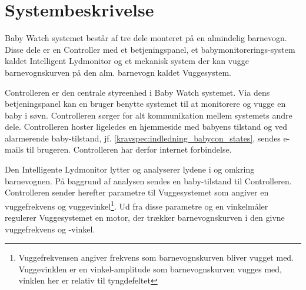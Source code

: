 \chapter{Systembeskrivelse}
Baby Watch systemet består af tre dele monteret på en almindelig barnevogn. Disse dele er en Controller med et betjeningspanel, et babymonitorerings-system kaldet Intelligent Lydmonitor og et mekanisk system der kan vugge barnevognskurven på den alm. barnevogn kaldet Vuggesystem.

Controlleren er den centrale styreenhed i Baby Watch systemet. Via dens betjeningspanel kan en bruger benytte systemet til at monitorere og vugge en baby i søvn. Controlleren sørger for alt kommunikation mellem systemets andre dele. Controlleren hoster ligeledes en hjemmeside med babyens tilstand og ved alarmerende baby-tilstand, jf. \ref{kravspec:indledning_babycon_states}, sendes e-mails til brugeren. Controlleren har derfor internet forbindelse.

Den Intelligente Lydmonitor lytter og analyserer lydene i og omkring barnevognen. På baggrund af analysen sendes en baby-tilstand til Controlleren. Controlleren sender herefter parametre til Vuggesystemet som angiver en vuggefrekvens og vuggevinkel\footnote{Vuggefrekvensen angiver frekvens som barnevognskurven bliver vugget med. Vuggevinklen er en vinkel-amplitude som barnevognskurven vugges med, vinklen her er relativ til tyngdefeltet}. Ud fra disse parametre og en vinkelmåler regulerer Vuggesystemet en motor, der trækker barnevognskurven i den givne vuggefrekvens og -vinkel.  

